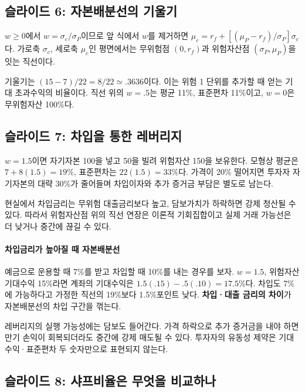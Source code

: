 \documentclass[11pt,a4paper]{article}
\begin{document}
\subsection{슬라이드 6: 자본배분선의 기울기}

$w\ge0$에서 $w=\sigma_c/\sigma_P$이므로 앞 식에서 $w$를 제거하면 $\mu_c=r_f+[(\mu_P-r_f)/\sigma_P]\sigma_c$다. 가로축 $\sigma_c$, 세로축 $\mu_c$인 평면에서는 무위험점 $(0,r_f)$과 위험자산점 $(\sigma_P,\mu_P)$을 잇는 직선이다.
\par

기울기는 $(15-7)/22=8/22\simeq.3636$이다. 이는 위험 1 단위를 추가할 때 얻는 기대 초과수익의 비율이다. 직선 위의 $w=.5$는 평균 11\%, 표준편차 11\%이고, $w=0$은 무위험자산 100\%다.
\par

\subsection{슬라이드 7: 차입을 통한 레버리지}

$w=1.5$이면 자기자본 100을 넣고 50을 빌려 위험자산 150을 보유한다. 모형상 평균은 $7+8(1.5)=19\%$, 표준편차는 $22(1.5)=33\%$다. 가격이 20\% 떨어지면 투자자 자기자본의 대략 30\%가 줄어들며 차입이자와 추가 증거금 부담은 별도로 남는다.
\par

현실에서 차입금리는 무위험 대출금리보다 높고, 담보가치가 하락하면 강제 청산될 수 있다. 따라서 위험자산점 위의 직선 연장은 이론적 기회집합이고 실제 거래 가능선은 더 낮거나 중간에 끊길 수 있다.
\par

\paragraph{차입금리가 높아질 때 자본배분선}

예금으로 운용할 때 7\%를 받고 차입할 때 10\%를 내는 경우를 보자. $w=1.5$, 위험자산 기대수익 15\%라면 계좌의 기대수익은 $1.5(.15)-.5(.10)=17.5\%$다. 차입도 7\%에 가능하다고 가정한 직선의 19\%보다 1.5\%포인트 낮다. \textbf{차입·대출 금리의 차이}가 자본배분선의 차입 구간을 꺾는다.
\par

레버리지의 실행 가능성에는 담보도 들어간다. 가격 하락으로 추가 증거금을 내야 하면 만기 손익이 회복되더라도 중간에 강제 매도될 수 있다. 투자자의 유동성 제약은 기대수익·표준편차 두 숫자만으로 표현되지 않는다.
\par

\subsection{슬라이드 8: 샤프비율은 무엇을 비교하나}
\end{document}
